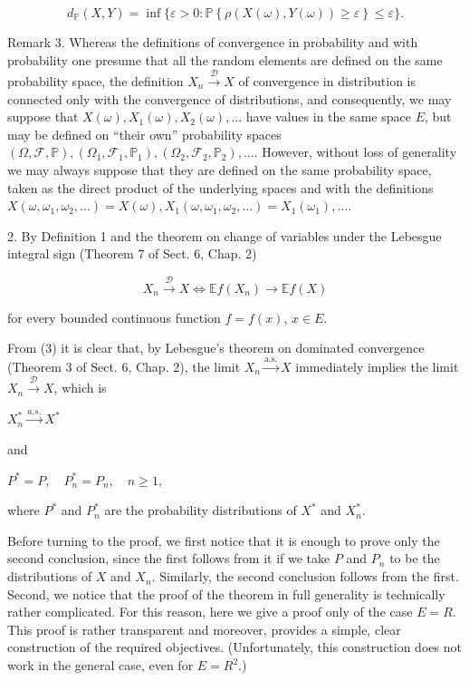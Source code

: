 $$d_{\mathbb{P}}(X, Y) = \inf \{ \varepsilon > 0 : \mathbb{P} \left\{ \rho(X(\omega), Y(\omega)) \geq \varepsilon \right\} \leq \varepsilon \}. \tag{2}$$

Remark 3. Whereas the definitions of convergence in probability and with probability one presume that all the random elements are defined on the same probability space, the definition $X_n \xrightarrow{\mathcal{D}} X$ of convergence in distribution is connected only with the convergence of distributions, and consequently, we may suppose that $X(\omega), X_1(\omega), X_2(\omega), \ldots$ have values in the same space $E$, but may be defined on “their own” probability spaces $(\Omega, \mathcal{F}, \mathbb{P}), (\Omega_1, \mathcal{F}_1, \mathbb{P}_1), (\Omega_2, \mathcal{F}_2, \mathbb{P}_2), \ldots$. However, without loss of generality we may always suppose that they are defined on the same probability space, taken as the direct product of the underlying spaces and with the definitions $X(\omega, \omega_1, \omega_2, \ldots) = X(\omega), X_1(\omega, \omega_1, \omega_2, \ldots) = X_1(\omega_1), \ldots$.

2. By Definition 1 and the theorem on change of variables under the Lebesgue integral sign (Theorem 7 of Sect. 6, Chap. 2)

$$X_n \xrightarrow{\mathcal{D}} X \Leftrightarrow \mathbb{E}f(X_n) \rightarrow \mathbb{E}f(X) \tag{3}$$

for every bounded continuous function $f = f(x)$, $x \in E$.

From (3) it is clear that, by Lebesgue’s theorem on dominated convergence (Theorem 3 of Sect. 6, Chap. 2), the limit $X_n \xrightarrow{\text{a.s.}} X$ immediately implies the limit $X_n \xrightarrow{\mathcal{D}} X$, which is

$X^*_n \xrightarrow{a.s.} X^*$

and

$P^* = P, \quad P^*_n = P_n, \quad n \geq 1,$

where $P^*$ and $P^*_n$ are the probability distributions of $X^*$ and $X^*_n$.

Before turning to the proof, we first notice that it is enough to prove only the second conclusion, since the first follows from it if we take $P$ and $P_n$ to be the distributions of $X$ and $X_n$. Similarly, the second conclusion follows from the first. Second, we notice that the proof of the theorem in full generality is technically rather complicated. For this reason, here we give a proof only of the case $E = R$. This proof is rather transparent and moreover, provides a simple, clear construction of the required objectives. (Unfortunately, this construction does not work in the general case, even for $E = R^2$.)
